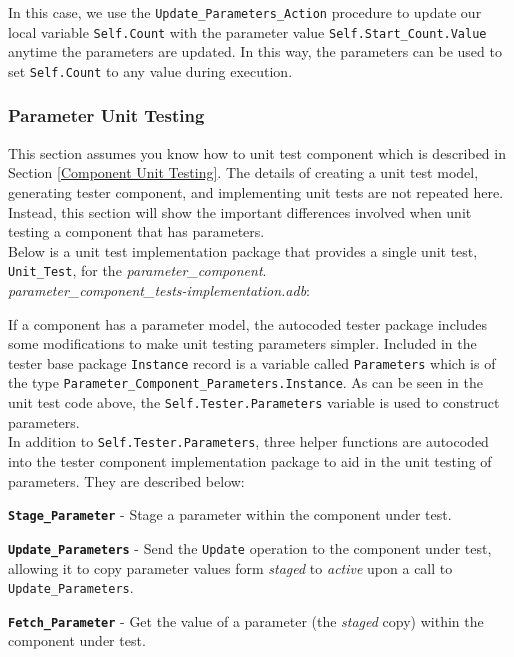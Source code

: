 In this case, we use the \texttt{Update\_Parameters\_Action} procedure to update our local variable \texttt{Self.Count} with the parameter value \texttt{Self.Start\_Count.Value} anytime the parameters are updated. In this way, the parameters can be used to set \texttt{Self.Count} to any value during execution.

\subsubsection{Parameter Unit Testing} \label{Parameter Unit Testing}

This section assumes you know how to unit test component which is described in Section \ref{Component Unit Testing}. The details of creating a unit test model, generating tester component, and implementing unit tests are not repeated here. Instead, this section will show the important differences involved when unit testing a component that has parameters. \\

Below is a unit test implementation package that provides a single unit test, \texttt{Unit\_Test}, for the \textit{parameter\_component}. \\

\textit{parameter\_component\_tests-implementation.adb}:

If a component has a parameter model, the autocoded tester package includes some modifications to make unit testing parameters simpler. Included in the tester base package \texttt{Instance} record is a variable called \texttt{Parameters} which is of the type \texttt{Parameter\_Component\_Parameters.Instance}. As can be seen in the unit test code above, the \texttt{Self.Tester.Parameters} variable is used to construct parameters. \\

In addition to \texttt{Self.Tester.Parameters}, three helper functions are autocoded into the tester component implementation package to aid in the unit testing of parameters. They are described below:

\vspace{5mm} %
\begin{spaceditemize}
  \item \textbf{\texttt{Stage\_Parameter}} - Stage a parameter within the component under test.
  \item \textbf{\texttt{Update\_Parameters}} - Send the \texttt{Update} operation to the component under test, allowing it to copy parameter values form \textit{staged} to \textit{active} upon a call to \texttt{Update\_Parameters}.
  \item \textbf{\texttt{Fetch\_Parameter}} - Get the value of a parameter (the \textit{staged} copy) within the component under test.
\end{spaceditemize}
\vspace{5mm} %

